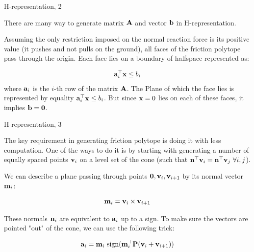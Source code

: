 \documentclass{beamer}
\begin{document}
\begin{frame}{H-representation, 2}
	\begin{flushleft}
		
		There are many way to generate matrix $\mathbf{A}$ and vector $\mathbf{b}$ in H-representation. 
		
		\bigskip
		
		Assuming the only restriction imposed on the normal reaction force is its positive value (it pushes and not pulls on the ground), all faces of the friction polytope pass through the origin. Each face lies on a boundary of  halfspace represented as:
		
		\begin{equation}
			\mathbf{a}_i^\top \mathbf{x} \leq b_i
		\end{equation}
		where $\mathbf{a}_i$ is the $i$-th row of the matrix $\mathbf{A}$. The Plane of which the face lies is represented by equality $\mathbf{a}_i^\top \mathbf{x} \leq b_i$. But since $\mathbf{x} = 0$ lies on each of these faces, it implies $\mathbf{b} = \mathbf{0}$.
		
	\end{flushleft}
\end{frame}



\begin{frame}{H-representation, 3}
	\begin{flushleft}
		
		The key requirement in generating friction polytope is doing it with less computation. One of the ways to do it is by starting with generating a number of equally spaced points $\mathbf{v}_i$ on a level set of the cone (such that $\bo{n}\T\bo{v}_i = \bo{n}\T\bo{v}_j \ \forall i,j$). 
		
		\bigskip
		
		We can describe a plane passing through points $\mathbf{0}, \mathbf{v}_i, \mathbf{v}_{i+1}$ by its normal vector $\mathbf{m}_i$:
		
		\begin{equation}
			\mathbf{m}_i = \mathbf{v}_i \times \mathbf{v}_{i+1}
		\end{equation}
		
		These normals $\mathbf{n}_i$ are equivalent to $\mathbf{a}_i$ up to a sign. To make sure the vectors are pointed "out" of the cone, we can use the following trick:
		
		\begin{equation}
			\bo{a}_i = \bo{m}_i \ \text{sign}(\bo{m}_i\T \bo{P}(\bo{v}_i + \bo{v}_{i+1}))
		\end{equation}
		
		
	\end{flushleft}
\end{frame}
\end{document}

